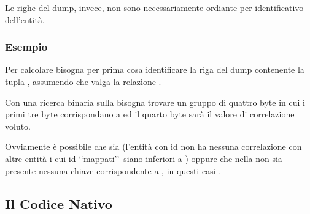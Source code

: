 Le righe del dump, invece, non sono necessariamente ordiante per identificativo dell'entità.

\subsubsection{Esempio}
Per calcolare  bisogna per prima cosa identificare la riga del dump contenente la tupla , 
assumendo che valga la relazione . 

Con una ricerca binaria sulla  bisogna trovare un gruppo di quattro byte in cui i primi tre byte corrispondano a 
ed il quarto byte sarà il valore di correlazione voluto. 

Ovviamente è possibile che  sia  (l'entità con id  non ha nessuna correlazione con altre entità i cui id \lq\lq mappati\rq\rq\ siano inferiori a ) oppure 
che nella  non sia presente nessuna chiave corrispondente a , in questi casi . 

\subsection{Il Codice Nativo}


